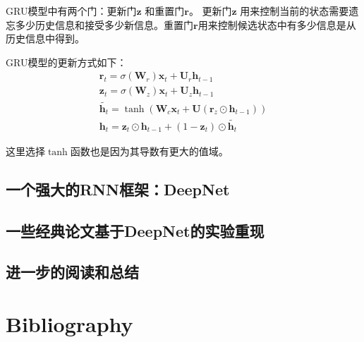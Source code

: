 \documentclass[11pt,fleqn, UTF8]{ctexbook} %
\begin{document}
GRU模型中有两个门：更新门$\boldsymbol{z}$ 和重置门$\boldsymbol{r}$。 更新门$\boldsymbol{z}$ 用来控制当前的状态需要遗忘多少历史信息和接受多少新信息。重置门$\boldsymbol{r}$用来控制候选状态中有多少信息是从历史信息中得到。

GRU模型的更新方式如下：
\begin{gather}\label{7.20}
  \boldsymbol{r}_t=\sigma(\boldsymbol{W}_r)\boldsymbol{x}_t+\boldsymbol{U}_r \boldsymbol{h}_{t-1} \\
  \boldsymbol{z}_t=\sigma(\boldsymbol{W}_z)\boldsymbol{x}_t+\boldsymbol{U}_z \boldsymbol{h}_{t-1}\\
  \widetilde{\boldsymbol{h}_t}=\tanh(\boldsymbol{W}_c\boldsymbol{x}_t+\boldsymbol{U}(\boldsymbol{r}_z\odot\boldsymbol{h}_{t-1}))\\
  \boldsymbol{h}_t=\boldsymbol{z}_t\odot\boldsymbol{h}_{t-1}+(1-\boldsymbol{z}_t)\odot\widetilde{\boldsymbol{h}_t}
\end{gather}

这里选择$\tanh$函数也是因为其导数有更大的值域。
\section{一个强大的RNN框架：DeepNet}
\section{一些经典论文基于DeepNet的实验重现}
\section{进一步的阅读和总结}

\chapter*{Bibliography}

%
%

\end{document}
